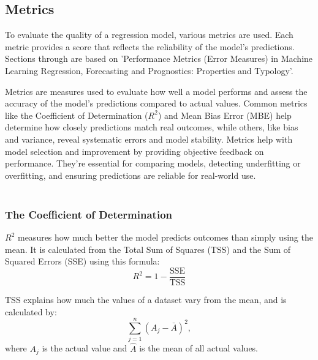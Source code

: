 \subsection{Metrics}
To evaluate the quality of a regression model, various metrics are used. Each metric provides a score that reflects the reliability of the model's predictions. Sections through are based on 'Performance Metrics (Error Measures) in Machine Learning Regression, Forecasting and Prognostics: Properties and Typology'\cite{metrics}. \newline

	\noindent Metrics are measures used to evaluate how well a model performs and assess the accuracy of the model’s predictions compared to actual values. Common metrics like the Coefficient of Determination ($R^{2}$) and Mean Bias Error (MBE) help determine how closely predictions match real outcomes, while others, like bias and variance, reveal systematic errors and model stability. Metrics help with model selection and improvement by providing objective feedback on performance. They’re essential for comparing models, detecting underfitting or overfitting, and ensuring predictions are reliable for real-world use.
\\\\

\subsubsection{The Coefficient of Determination}
$R^2$ measures how much better the model predicts outcomes than simply using the mean. It is calculated from the Total Sum of Squares (TSS) and the Sum of Squared Errors (SSE) using this formula: 
\begin{equation}
R^2=1-\frac{\text{SSE}}{\text{TSS}}
\end{equation}

\noindent TSS explains how much the values of a dataset vary from the mean, and is calculated by: 
\begin{equation}
\sum_{j=1}^{n}(A_j - \bar{A})^2,
\end{equation}
where $A_j$ is the actual value and $\hat{A}$ is the mean of all actual values.
\\\\

